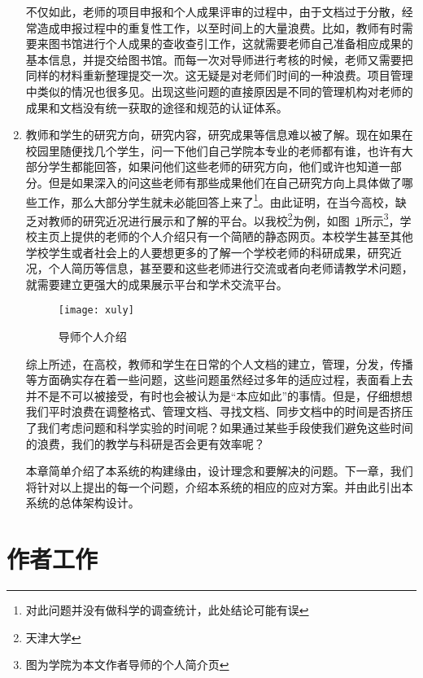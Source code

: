 \begin{enumerate}
不仅如此，老师的项目申报和个人成果评审的过程中，由于文档过于分散，经常造成申报过程中的重复性工作，以至时间上的大量浪费。比如，教师有时需要来图书馆进行个人成果的查收查引工作，这就需要老师自己准备相应成果的基本信息，并提交给图书馆。而每一次对导师进行考核的时候，老师又需要把同样的材料重新整理提交一次。这无疑是对老师们时间的一种浪费。项目管理中类似的情况也很多见。出现这些问题的直接原因是不同的管理机构对老师的成果和文档没有统一获取的途径和规范的认证体系。
\item 教师和学生的研究方向，研究内容，研究成果等信息难以被了解。现在如果在校园里随便找几个学生，问一下他们自己学院本专业的老师都有谁，也许有大部分学生都能回答，如果问他们这些老师的研究方向，他们或许也知道一部分。但是如果深入的问这些老师有那些成果他们在自己研究方向上具体做了哪些工作，那么大部分学生就未必能回答上来了\footnote{对此问题并没有做科学的调查统计，此处结论可能有误}。由此证明，在当今高校，缺乏对教师的研究近况进行展示和了解的平台。以我校\footnote{天津大学}为例，如图~\ref{fig:xfig1}所示\footnote{图为学院为本文作者导师的个人简介页}，学校主页上提供的老师的个人介绍只有一个简陋的静态网页。本校学生甚至其他学校学生或者社会上的人要想更多的了解一个学校老师的科研成果，研究近况，个人简历等信息，甚至要和这些老师进行交流或者向老师请教学术问题，就需要建立更强大的成果展示平台和学术交流平台。
\begin{figure}[H] 
  \centering
  \texttt{[image: xuly]}
  \caption{导师个人介绍}
  \label{fig:xfig1}
\end{figure}
综上所述，在高校，教师和学生在日常的个人文档的建立，管理，分发，传播等方面确实存在着一些问题，这些问题虽然经过多年的适应过程，表面看上去并不是不可以被接受，有时也会被认为是“本应如此”的事情。但是，仔细想想我们平时浪费在调整格式、管理文档、寻找文档、同步文档中的时间是否挤压了我们考虑问题和科学实验的时间呢？如果通过某些手段使我们避免这些时间的浪费，我们的教学与科研是否会更有效率呢？

本章简单介绍了本系统的构建缘由，设计理念和要解决的问题。下一章，我们将针对以上提出的每一个问题，介绍本系统的相应的应对方案。并由此引出本系统的总体架构设计。
\end{enumerate}

\section{作者工作}
\label{sec:task}

